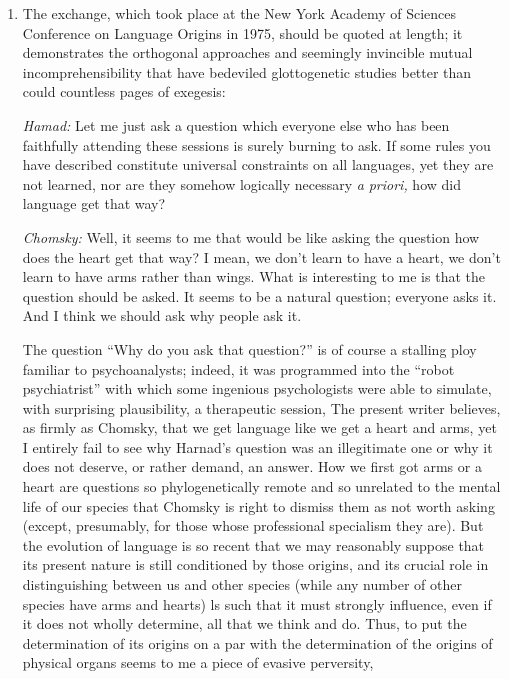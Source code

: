 \begin{enumerate}
\item The exchange, which took place at the New York Academy of Sciences Conference on Language Origins in 1975, should be quoted at length; it demonstrates the orthogonal approaches and seemingly 
invincible mutual incomprehensibility that have bedeviled glottogenetic
studies better than could countless pages of exegesis:

\textit{Hamad:} Let me just ask a question which everyone else who has been faithfully attending these sessions is surely burning to ask. If some rules you have described constitute universal constraints on all languages, yet they are not learned, nor are they somehow logically necessary \textit{a} \textit{priori,} how did language get that way?

\textit{Chomsky:} Well, it seems to me that would be like asking the question how does the heart get that way? I mean, we don't learn to have a heart, we don't learn to have arms rather than wings. What is interesting to me is that the question should be asked. It seems to be a natural question; everyone asks it. And I think we should ask why people ask it.

The question ``Why do you ask that question?'' is of course a stalling ploy familiar to psychoanalysts; indeed, it was programmed into the ``robot psychiatrist'' with which some ingenious psychologists were able to simulate, with surprising plausibility, a therapeutic session, The present writer believes, as firmly as Chomsky, that we get language like
we get a heart and arms, yet I entirely fail to see why Harnad's question
was an illegitimate one or why it does not deserve, or rather demand, an answer. How we first got arms or a heart are questions so phylo\-genetically remote and so unrelated to the mental life of our species that Chomsky is right to dismiss them as not worth asking (except, presumably, for those whose professional specialism they are). But the evolution of language is so recent that we may reasonably suppose that its present nature is still conditioned by those origins, and its crucial role in distinguishing between us and other species (while any number of other species have arms and hearts) ls such that it must strongly influence, even if it does not wholly determine, all that we think and do. Thus, to put the determination of its origins on a par
with the determination of the origins of physical organs seems to me a piece of evasive perversity,


\end{enumerate}
